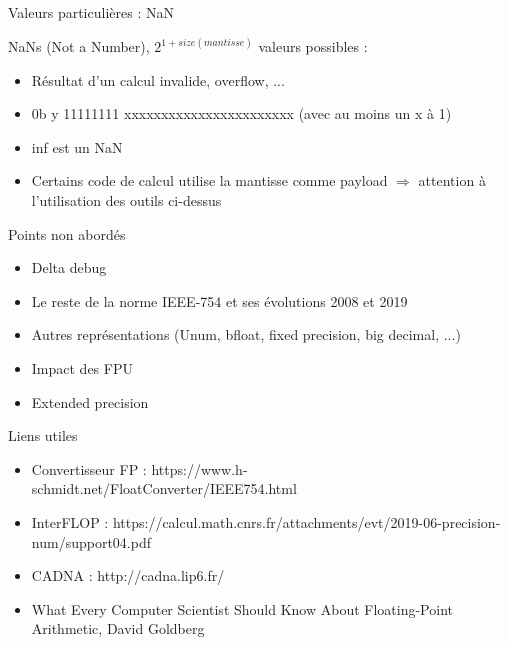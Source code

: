 \documentclass{beamer}
\begin{document}
  \begin{frame}{Valeurs particulières : NaN}
      \begin{large}
  NaNs (Not a Number), $2^{1+size(mantisse)}$ valeurs possibles :
  \begin{itemize}
  \item Résultat d'un calcul invalide, overflow, ...
  \item 0b \textcolor{SignColor}{y} \textcolor{ExponentColor}{11111111} \textcolor{FractionColor}{xxxxxxxxxxxxxxxxxxxxxxx} (avec au moins un x à 1)\\
  \item inf est un NaN
  \item Certains code de calcul utilise la mantisse comme payload $\Rightarrow$ attention à l'utilisation des outils ci-dessus
  \end{itemize}
        \end{large}
  \end{frame}

  \begin{frame}{Points non abordés}
  \begin{itemize}
  \item Delta debug
  \item Le reste de la norme IEEE-754 et ses évolutions 2008 et 2019
  \item Autres représentations (Unum, bfloat, fixed precision, big decimal, ...)
  \item Impact des FPU
  \item Extended precision
  \end{itemize}
  \end{frame}

  \begin{frame}{Liens utiles}
  \begin{itemize}
  \item Convertisseur FP : https://www.h-schmidt.net/FloatConverter/IEEE754.html
  \item InterFLOP : https://calcul.math.cnrs.fr/attachments/evt/2019-06-precision-num/support04.pdf
  \item CADNA : http://cadna.lip6.fr/
  \item What Every Computer Scientist Should Know About Floating-Point Arithmetic, David Goldberg
  \end{itemize}
  \end{frame}
\end{document}
